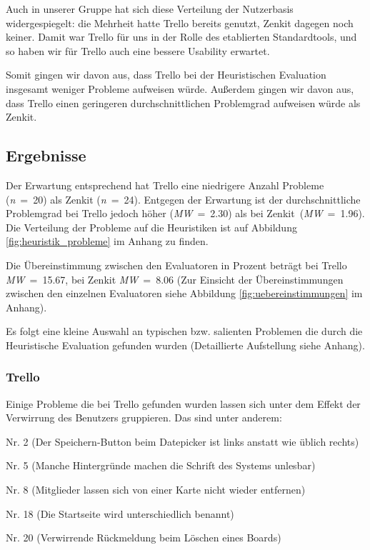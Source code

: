 Auch in unserer Gruppe hat sich diese Verteilung der Nutzerbasis widergespiegelt: die Mehrheit hatte Trello bereits genutzt, Zenkit dagegen noch keiner.
Damit war Trello für uns in der Rolle des etablierten Standardtools, und so haben wir für Trello auch eine bessere Usability erwartet.

Somit gingen wir davon aus, dass Trello bei der Heuristischen Evaluation insgesamt weniger Probleme aufweisen würde.
Außerdem gingen wir davon aus, dass Trello einen geringeren durchschnittlichen Problemgrad aufweisen würde als Zenkit.


\subsection{Ergebnisse}
Der Erwartung entsprechend hat Trello eine niedrigere Anzahl Probleme (\textit{n}~=~20) als Zenkit (\textit{n}~=~24). Entgegen der Erwartung ist der durchschnittliche Problemgrad bei Trello jedoch höher (\textit{MW}~=~2.30) als bei Zenkit~(\textit{MW}~=~1.96). Die Verteilung der Probleme auf die Heuristiken ist auf Abbildung \ref{fig:heuristik_probleme} im Anhang zu finden.

Die Übereinstimmung zwischen den Evaluatoren in Prozent beträgt bei Trello \textit{MW}~=~15.67, bei Zenkit \textit{MW}~=~8.06 (Zur Einsicht der Übereinstimmungen zwischen den einzelnen Evaluatoren siehe Abbildung \ref{fig:uebereinstimmungen} im Anhang).


Es folgt eine kleine Auswahl an typischen bzw. salienten Problemen die durch die Heuristische Evaluation gefunden wurden (Detaillierte Aufstellung siehe Anhang).\\

\subsubsection{Trello}
Einige Probleme die bei Trello gefunden wurden lassen sich unter dem Effekt der Verwirrung des Benutzers gruppieren. Das sind unter anderem:
\begin{APAitemize}
    \item Nr. 2 (Der Speichern-Button beim Datepicker ist links anstatt wie üblich rechts)
    \item Nr. 5 (Manche Hintergründe machen die Schrift des Systems unlesbar)
    \item Nr. 8 (Mitglieder lassen sich von einer Karte nicht wieder entfernen)
    \item Nr. 18 (Die Startseite wird unterschiedlich benannt)
    \item Nr. 20 (Verwirrende Rückmeldung beim Löschen eines Boards)\\
\end{APAitemize}


